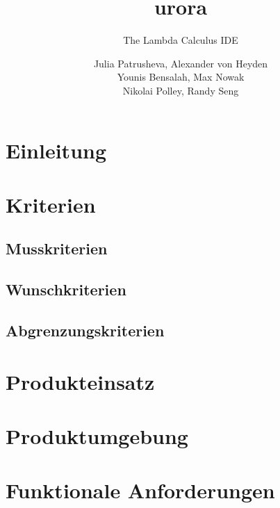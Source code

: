 \documentclass[parskip=full,11pt,twoside]{scrartcl}
\title{{\Huge \lambda urora}}
\subtitle{The Lambda Calculus IDE}
\author{Julia Patrusheva, Alexander von Heyden\\
Younis Bensalah, Max Nowak\\ 
Nikolai Polley, Randy Seng}
\begin{document}
\maketitle
\newpage
\section{Einleitung}


\pagebreak
\section{Kriterien}

\subsection{Musskriterien}



\subsection{Wunschkriterien}


\subsection{Abgrenzungskriterien}



\pagebreak
\section{Produkteinsatz}


\section{Produktumgebung}


\section{Funktionale Anforderungen}

\end{document}
